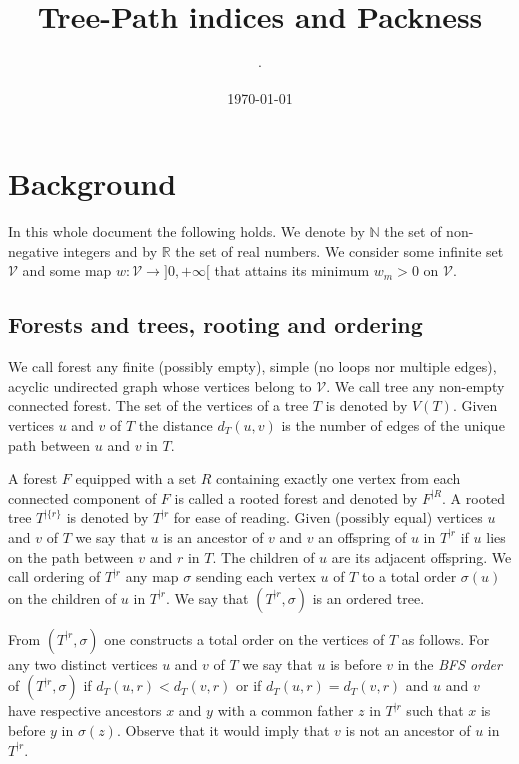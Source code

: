 \documentclass[11 pt]{modarticle}
\title{Tree-Path indices and Packness}
\date{\today}
\author[1]{$\cdot$}
\newcommand{\cN}{\mathbb{N}}
\newcommand{\cR}{\mathbb{R}}
\newcommand{\vset}{\mathcal{V}}
\newcommand{\wmap}{w}
\newcommand{\wmin}{w_m}
\newcommand{\vsetof}[1]{V(#1)}
\newcommand{\distance}[3]{d_{#3}(#1,#2)}
\newcommand{\rtree}[2]{{#1}^{\lvert #2}}
\newcommand{\ortree}[3]{(\rtree{#1}{#2},{#3})}
\begin{document}
\maketitle
\thispagestyle{empty} %

\begin{abstract}
\end{abstract}

\tableofcontents
	
\pagebreak

\section{Background}

In this whole document the following holds. We denote by $\cN$ the set of non-negative integers and by $\cR$ the set of real numbers. We consider some infinite set $\vset$ and some map $\wmap : \vset \to ]0,+\infty[$ that attains its minimum $\wmin > 0$ on $\vset$.

\subsection{Forests and trees, rooting and ordering}

We call forest any finite (possibly empty), simple (no loops nor multiple edges), acyclic undirected graph whose vertices belong to $\vset$. We call tree any non-empty connected forest. The set of the vertices of a tree $T$ is denoted by $\vsetof{T}$. Given vertices $u$ and $v$ of $T$ the distance $\distance{u}{v}{T}$ is the number of edges of the unique path between $u$ and $v$ in $T$.

A forest $F$ equipped with a set $R$ containing exactly one vertex from each connected component of $F$ is called a rooted forest and denoted by $\rtree{F}{R}$. %
A rooted tree $\rtree{T}{\{r\}}$ is denoted by $\rtree{T}{r}$ for ease of reading. Given (possibly equal) vertices $u$ and $v$ of $T$ we say that $u$ is an ancestor of $v$ and $v$ an offspring of $u$ in $\rtree{T}{r}$ if $u$ lies on the path between $v$ and $r$ in $T$. The children of $u$ are its adjacent offspring. We call ordering of $\rtree{T}{r}$ any map $\sigma$ sending each vertex $u$ of $T$ to a total order $\sigma(u)$ on the children of $u$ in $\rtree{T}{r}$. We say that $\ortree{T}{r}{\sigma}$ is an ordered tree.

From $\ortree{T}{r}{\sigma}$ one constructs a total order on the vertices of $T$ as follows. For any two distinct vertices $u$ and $v$ of $T$ we say that $u$ is before $v$ in the \textit{BFS order} of $\ortree{T}{r}{\sigma}$ if $\distance{u}{r}{T} < \distance{v}{r}{T}$ or if $\distance{u}{r}{T} = \distance{v}{r}{T}$ and $u$ and $v$ have respective ancestors $x$ and $y$ with a common father $z$ in $\rtree{T}{r}$ such that $x$ is before $y$ in $\sigma(z)$. Observe that it would imply that $v$ is not an ancestor of $u$ in $\rtree{T}{r}$.
\end{document}
